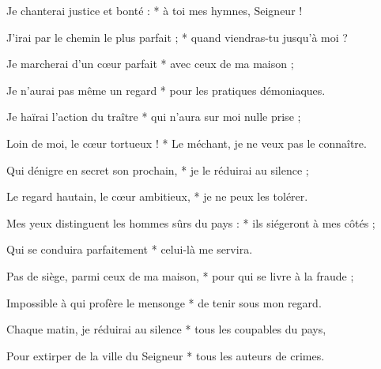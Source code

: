 \item Je chanterai justice et bonté : * à toi mes hymnes, Seigneur !
\item J'irai par le chemin le plus parfait ; * quand viendras-tu jusqu'à moi ? 
\item Je marcherai d'un cœur parfait * avec ceux de ma maison ;
\item Je n'aurai pas même un regard * pour les pratiques démoniaques. 
\item Je haïrai l'action du traître * qui n'aura sur moi nulle prise ;
\item Loin de moi, le cœur tortueux ! * Le méchant, je ne veux pas le connaître.
\item Qui dénigre en secret son prochain, * je le réduirai au silence ;
\item Le regard hautain, le cœur ambitieux, * je ne peux les tolérer.
\item Mes yeux distinguent les hommes sûrs du pays : * ils siégeront à mes côtés ;
\item Qui se conduira parfaitement * celui-là me servira.
\item Pas de siège, parmi ceux de ma maison, * pour qui se livre à la fraude ;
\item Impossible à qui profère le mensonge * de tenir sous mon regard.
\item Chaque matin, je réduirai au silence * tous les coupables du pays,
\item Pour extirper de la ville du Seigneur * tous les auteurs de crimes.
